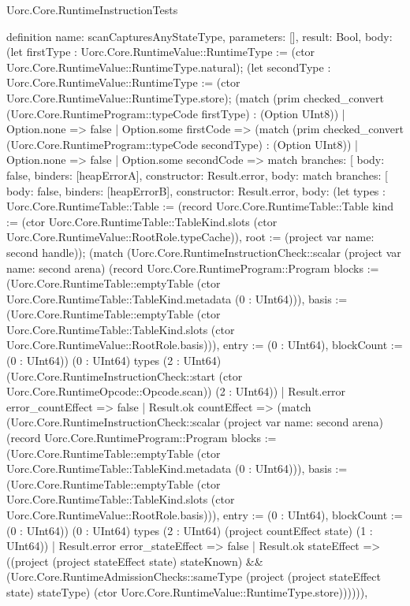 \begin{lexlean}{Uorc.Core.RuntimeInstructionTests}
\begin{semanticmodule}
definition{
  name: scanCapturesAnyStateType,
  parameters: [],
  result: Bool,
  body: (let firstType : Uorc.Core.RuntimeValue::RuntimeType := (ctor Uorc.Core.RuntimeValue::RuntimeType.natural); (let secondType : Uorc.Core.RuntimeValue::RuntimeType := (ctor Uorc.Core.RuntimeValue::RuntimeType.store); (match (prim checked_convert (Uorc.Core.RuntimeProgram::typeCode firstType) : (Option UInt8))
    | Option.none => false
    | Option.some firstCode => (match (prim checked_convert (Uorc.Core.RuntimeProgram::typeCode secondType) : (Option UInt8))
      | Option.none => false
      | Option.some secondCode => match{
        branches: [
          {body: false, binders: [heapErrorA], constructor: Result.error},
          {
            body: match{
              branches: [
                {body: false, binders: [heapErrorB], constructor: Result.error},
                {
                  body: (let types : Uorc.Core.RuntimeTable::Table := (record Uorc.Core.RuntimeTable::Table {kind := (ctor Uorc.Core.RuntimeTable::TableKind.slots (ctor Uorc.Core.RuntimeValue::RootRole.typeCache)), root := (project var{
                    name: second
                  } handle)}); (match (Uorc.Core.RuntimeInstructionCheck::scalar (project var{
                      name: second
                    } arena) (record Uorc.Core.RuntimeProgram::Program {blocks := (Uorc.Core.RuntimeTable::emptyTable (ctor Uorc.Core.RuntimeTable::TableKind.metadata (0 : UInt64))), basis := (Uorc.Core.RuntimeTable::emptyTable (ctor Uorc.Core.RuntimeTable::TableKind.slots (ctor Uorc.Core.RuntimeValue::RootRole.basis))), entry := (0 : UInt64), blockCount := (0 : UInt64)}) (0 : UInt64) types (2 : UInt64) (Uorc.Core.RuntimeInstructionCheck::start (ctor Uorc.Core.RuntimeOpcode::Opcode.scan)) (2 : UInt64))
                    | Result.error error_countEffect => false
                    | Result.ok countEffect => (match (Uorc.Core.RuntimeInstructionCheck::scalar (project var{
                        name: second
                      } arena) (record Uorc.Core.RuntimeProgram::Program {blocks := (Uorc.Core.RuntimeTable::emptyTable (ctor Uorc.Core.RuntimeTable::TableKind.metadata (0 : UInt64))), basis := (Uorc.Core.RuntimeTable::emptyTable (ctor Uorc.Core.RuntimeTable::TableKind.slots (ctor Uorc.Core.RuntimeValue::RootRole.basis))), entry := (0 : UInt64), blockCount := (0 : UInt64)}) (0 : UInt64) types (2 : UInt64) (project countEffect state) (1 : UInt64))
                      | Result.error error_stateEffect => false
                      | Result.ok stateEffect => ((project (project stateEffect state) stateKnown) && (Uorc.Core.RuntimeAdmissionChecks::sameType (project (project stateEffect state) stateType) (ctor Uorc.Core.RuntimeValue::RuntimeType.store)))))),
}}}}}
\end{semanticmodule}
\end{lexlean}
